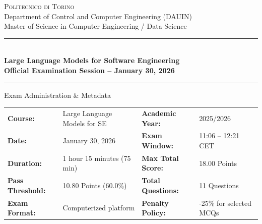 \documentclass[11pt,a4paper]{article}
\begin{document}

\begin{center}
    {\Large\textsc{Politecnico di Torino}}\\[4pt]
    {\large Department of Control and Computer Engineering (DAUIN)}\\[2pt]
    {\large Master of Science in Computer Engineering / Data Science}\\[6pt]
    \rule{\linewidth}{1.2pt}\\[6pt]
    {\LARGE\textbf{Large Language Models for Software Engineering}}\\[4pt]
    {\Large\textbf{Official Examination Session -- January 30, 2026}}\\[6pt]
    \rule{\linewidth}{0.6pt}
\end{center}

\vspace{0.5em}

\begin{summarybox}{Exam Administration \& Metadata}
\begin{tabularx}{\linewidth}{lXlX}
    \textbf{Course:} & Large Language Models for SE & \textbf{Academic Year:} & 2025/2026 \\
    \textbf{Date:} & January 30, 2026 & \textbf{Exam Window:} & 11:06 -- 12:21 CET \\
    \textbf{Duration:} & 1 hour 15 minutes (75 min) & \textbf{Max Total Score:} & 18.00 Points \\
    \textbf{Pass Threshold:} & 10.80 Points (60.0\%) & \textbf{Total Questions:} & 11 Questions \\
    \textbf{Exam Format:} & Computerized platform & \textbf{Penalty Policy:} & -25\% for selected MCQs \\
\end{tabularx}
\end{summarybox}

\vspace{0.5em}
\end{document}

